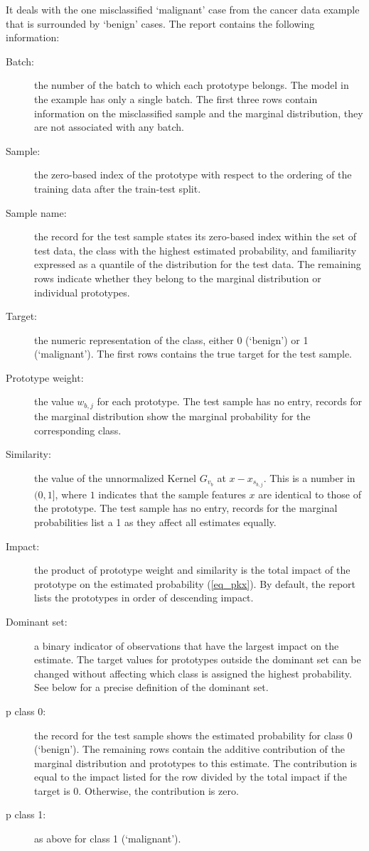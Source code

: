 It deals with the one misclassified `malignant' case from the cancer data example that is surrounded by `benign' cases.
The report contains the following information:
%
\begin{description}
\item[Batch:] the number of the batch to which each prototype belongs.
The model in the example has only a single batch.
The first three rows contain information on the misclassified sample and the marginal distribution, they are not associated with any batch.
%
\item[Sample:] the zero-based index of the prototype with respect to the ordering of the training data after the train-test split.
%
\item[Sample name:] the record for the test sample states its zero-based index within the set of test data, the class with the highest estimated probability, and familiarity expressed as a quantile of the distribution for the test data.
The remaining rows indicate whether they belong to the marginal distribution or individual prototypes.
%
\item[Target:] the numeric representation of the class, either 0 (`benign') or 1 (`malignant').
The first rows contains the true target for the test sample.
%
\item[Prototype weight:] the value $w_{b,j}$ for each prototype.
The test sample has no entry, records for the marginal distribution show the marginal probability for the corresponding class.
%
\item[Similarity:] the value of the unnormalized Kernel $G_{v_b}$ at $x-x_{s_{b,j}}$.
This is a number in $(0,1]$, where $1$ indicates that the sample features $x$ are identical to those of the prototype.
The test sample has no entry, records for the marginal probabilities list a 1 as they affect all estimates equally.
%
\item[Impact:] the product of prototype weight and similarity is the total impact of the prototype on the estimated probability (\ref{eq_pkx}).
By default, the report lists the prototypes in order of descending impact.
%
\item[Dominant set:] a binary indicator of observations that have the largest impact on the estimate.
The target values for prototypes outside the dominant set can be changed without affecting which class is assigned the highest probability.
See below for a precise definition of the dominant set.
%
\item[p class 0:] the record for the test sample shows the estimated probability for class 0 (`benign').
The remaining rows contain the additive contribution of the marginal distribution and prototypes to this estimate.
The contribution is equal to the impact listed for the row divided by the total impact if the target is 0.
Otherwise, the contribution is zero.
%
\item[p class 1:] as above for class 1 (`malignant').
\end{description}
